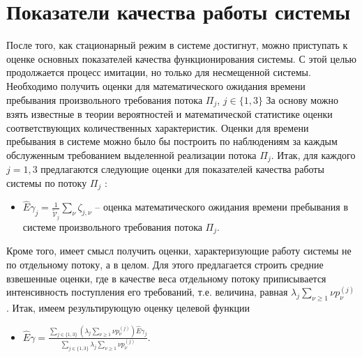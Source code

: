 \documentclass[a4paper,12pt,russian]{extarticle}
\begin{document}
\section{Показатели качества работы системы}
После того, как стационарный режим в системе достигнут, можно приступать к оценке основных показателей качества функционирования системы. С этой целью продолжается процесс имитации, но только для несмещенной системы. Необходимо получить оценки для математического ожидания времени пребывания произвольного требования потока $\Pi_j$, $j\in \{1, 3\}$
За основу можно взять известные в теории вероятностей и математической статистике оценки соответствующих количественных характеристик. Оценки для времени пребывания в системе можно было бы построить по наблюдениям за каждым обслуженным требованием выделенной реализации потока $\Pi_j$.
Итак, для каждого $j=1,3$  предлагаются следующие оценки для показателей качества работы системы по потоку $\Pi_j$ :
\begin{itemize}
    \item $\hat{E}\gamma_{j}=\frac{1}{\tilde{\mathcal{V}}_j}\sum_{\nu}\zeta_{j,\nu}$  -- оценка математического ожидания времени пребывания в системе произвольного требования потока $\Pi_j$.
\end{itemize}
Кроме того, имеет смысл получить оценки, характеризующие работу системы не по отдельному потоку, а в целом. Для этого предлагается строить средние взвешенные оценки, где в качестве веса отдельному потоку  приписывается интенсивность поступления его требований, т.е. величина, равная $\lambda_j \sum_{\nu\geqslant1}\nu p_{\nu}^{(j)}$. Итак, имеем результирующую оценку целевой функции
\begin{itemize}
    \item $\hat{E}\gamma=\frac{\sum_{j\in\{1,3\}} (\lambda_j \sum_{\nu\geqslant1}\nu p_{\nu}^{(j)})\hat{E}\gamma_{j} }{\sum_{j\in\{1,3\}} \lambda_j \sum_{\nu\geqslant1}\nu p_{\nu}^{(j)}}$.
\end{itemize}
\end{document}
